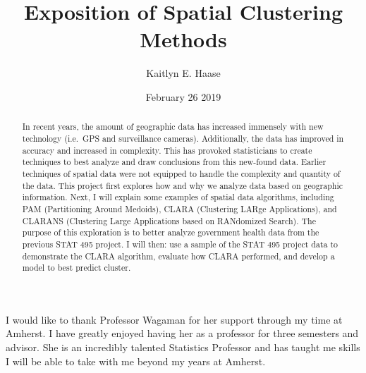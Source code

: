 \documentclass[12pt,twoside]{amherstthesis}
\title{Exposition of Spatial Clustering Methods}
\author{Kaitlyn E. Haase}
\date{February 26 2019}
\begin{document}
      \maketitle
  
  \frontmatter %
  \pagestyle{empty} %

      \begin{acknowledgements}
      I would like to thank Professor Wagaman for her support through my time
      at Amherst. I have greatly enjoyed having her as a professor for three
      semesters and advisor. She is an incredibly talented Statistics
      Professor and has taught me skills I will be able to take with me beyond
      my years at Amherst.
    \end{acknowledgements}
  
  

      \hypersetup{linkcolor=black}
    \setcounter{tocdepth}{2}
    \tableofcontents
  
      \listoftables
  
      \listoffigures
  
      \begin{abstract}
      In recent years, the amount of geographic data has increased immensely
      with new technology (i.e.~GPS and surveillance cameras). Additionally,
      the data has improved in accuracy and increased in complexity. This has
      provoked statisticians to create techniques to best analyze and draw
      conclusions from this new-found data. Earlier techniques of spatial data
      were not equipped to handle the complexity and quantity of the data.
      This project first explores how and why we analyze data based on
      geographic information. Next, I will explain some examples of spatial
      data algorithms, including PAM (Partitioning Around Medoids), CLARA
      (Clustering LARge Applications), and CLARANS (Clustering Large
      Applications based on RANdomized Search). The purpose of this
      exploration is to better analyze government health data from the
      previous STAT 495 project. I will then: use a sample of the STAT 495
      project data to demonstrate the CLARA algorithm, evaluate how CLARA
      performed, and develop a model to best predict cluster.
    \end{abstract}
  
  
  \mainmatter %
  \pagestyle{fancyplain} %
\end{document}
